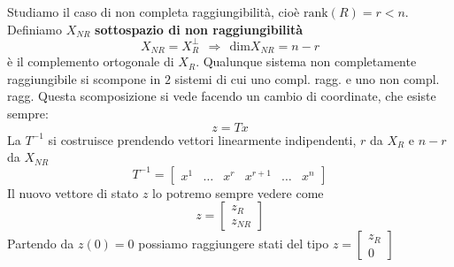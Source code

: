 \documentclass[10pt,a4paper]{book}
\begin{document}
Studiamo il caso di non completa raggiungibilità, cioè $\mathrm{rank}( R) =r< n$. Definiamo $X_{NR}$ \textbf{sottospazio di non raggiungibilità}
\begin{equation*}
X_{NR} =X^{\perp }_{R} \ \ \Rightarrow \ \ \mathrm{dim} X_{NR} =n-r
\end{equation*}
è il complemento ortogonale di $X_{R}$. Qualunque sistema non completamente raggiungibile si scompone in $2$ sistemi di cui uno compl. ragg. e uno non compl. ragg. Questa scomposizione si vede facendo un cambio di coordinate, che esiste sempre:
\begin{equation*}
z=Tx
\end{equation*}
La $T^{-1}$ si costruisce prendendo vettori linearmente indipendenti, $r$ da $X_{R}$ e $n-r$ da $X_{NR}$
\begin{equation*}
T^{-1} =\begin{bmatrix}
x^{1} & \dotsc  & x^{r} & x^{r+1} & \dotsc  & x^{n}
\end{bmatrix}
\end{equation*}
Il nuovo vettore di stato $z$ lo potremo sempre vedere come
\begin{equation*}
z=\begin{bmatrix}
z_{R}\\
z_{NR}
\end{bmatrix}
\end{equation*}
Partendo da $z( 0) =0$ possiamo raggiungere stati del tipo $z=\begin{bmatrix}
z_{R}\\
0
\end{bmatrix}$
\end{document}
